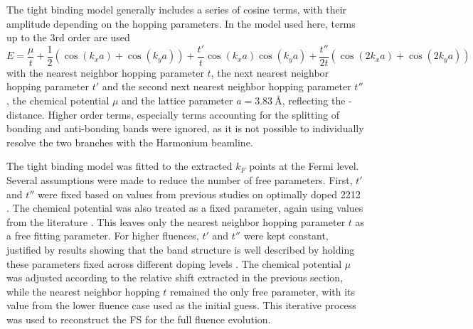 The tight binding model generally includes a series of cosine terms, with their amplitude depending on the hopping parameters.
In the model used here, terms up to the 3rd order are used
\begin{equation}
	E = \frac{\mu}{t} + \frac{1}{2} \left(\cos(k_xa)+\cos(k_ya)\right) + \frac{t'}{t} \cos(k_xa)\cos(k_ya) + \frac{t''}{2t} \left(\cos(2k_xa)+\cos(2k_ya)\right)
\end{equation}
with the nearest neighbor hopping parameter $t$, the next nearest neighbor hopping parameter $t'$ and the second next nearest neighbor hopping parameter $t''$, the chemical potential $\mu$ and the lattice parameter $a=\qty{3.83}{\angstrom}$, reflecting the - distance.
Higher order terms, especially terms accounting for the splitting of bonding and anti-bonding bands were ignored, as it is not possible to individually resolve the two branches with the Harmonium beamline.

The tight binding model was fitted to the extracted $k_F$ points at the Fermi level.
Several assumptions were made to reduce the number of free parameters.
First, $t'$ and $t''$ were fixed based on values from previous studies on optimally doped 2212 \cite{kondo_hole-concentration_2004}.
The chemical potential was also treated as a fixed parameter, again using values from the literature \cite{kondo_hole-concentration_2004}.
This leaves only the nearest neighbor hopping parameter $t$ as a free fitting parameter.
For higher fluences, $t'$ and $t''$ were kept constant, justified by results showing that the band structure is well described by holding these parameters fixed across different doping levels \cite{drozdov_phase_2018}.
The chemical potential $\mu$ was adjusted according to the relative shift extracted in the previous section, while the nearest neighbor hopping $t$ remained the only free parameter, with its value from the lower fluence case used as the initial guess.
This iterative process was used to reconstruct the FS for the full fluence evolution.

